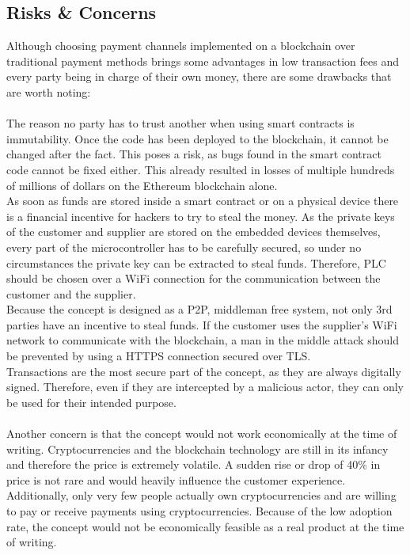 \subsection{Risks \& Concerns}
Although choosing payment channels implemented on a blockchain over traditional payment methods brings some advantages in low transaction fees and every party being in charge of their own money, there are some drawbacks that are worth noting:
\\\\
The reason no party has to trust another when using smart contracts is immutability.
Once the code has been deployed to the blockchain, it cannot be changed after the fact.
This poses a risk, as bugs found in the smart contract code cannot be fixed either.
This already resulted in losses of multiple hundreds of millions of dollars on the Ethereum blockchain alone\cite{dao-hack}.
\\
As soon as funds are stored inside a smart contract or on a physical device there is a financial incentive for hackers to try to steal the money.
As the private keys of the customer and supplier are stored on the embedded devices themselves, every part of the microcontroller has to be carefully secured, so under no circumstances the private key can be extracted to steal funds.
Therefore, PLC should be chosen over a WiFi connection for the communication between the customer and the supplier.
\\
Because the concept is designed as a P2P, middleman free system, not only 3rd parties have an incentive to steal funds.
If the customer uses the supplier's WiFi network to communicate with the blockchain, a man in the middle attack should be prevented by using a HTTPS connection secured over TLS.
\\
Transactions are the most secure part of the concept, as they are always digitally signed.
Therefore, even if they are intercepted by a malicious actor, they can only be used for their intended purpose.
\\\\
Another concern is that the concept would not work economically at the time of writing.
Cryptocurrencies and the blockchain technology are still in its infancy and therefore the price is extremely volatile.
A sudden rise or drop of 40\% in price is not rare and would heavily influence the customer experience.
Additionally, only very few people actually own cryptocurrencies and are willing to pay or receive payments using cryptocurrencies.
Because of the low adoption rate, the concept would not be economically feasible as a real product at the time of writing.
\newpage
